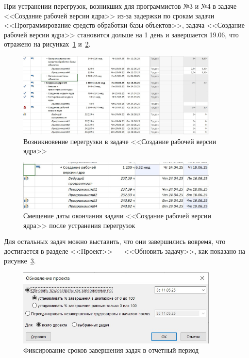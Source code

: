 При устранении перегрузок, возникших для программистов №3 и №4 в задаче <<Создание рабочей версии ядра>> из-за задержки по срокам задачи  <<Программирование средств обработки базы объектов>>, задача <<Создание рабочей версии ядра>> становится дольше на 1 день и завершается 19.06, что отражено на рисунках~\ref{fig:screen19} и~\ref{fig:screen20}.

\begin{figure}[H]
	\centering
	\includegraphics[width=0.9\textwidth]{img/lab4/screen19.jpg}
	\caption{Возникновение перегрузки в задаче <<Создание рабочей версии ядра>>}
	\label{fig:screen19}
\end{figure}

\begin{figure}[H]
	\centering
	\includegraphics[width=0.9\textwidth]{img/lab4/screen20.jpg}
	\caption{Смещение даты окончания задачи <<Создание рабочей версии ядра>> после устранения перегрузок}
	\label{fig:screen20}
\end{figure}

Для остальных задач можно выставить, что они завершились вовремя, что достигается в разделе <<Проект>> --- <<Обновить задачу>>, как показано на рисунке~\ref{fig:screen34}.

\begin{figure}[H]
	\centering
	\includegraphics[width=0.9\textwidth]{img/lab4/screen34.jpg}
	\caption{Фиксирование сроков завершения задач в отчетный период}
	\label{fig:screen34}
\end{figure}


